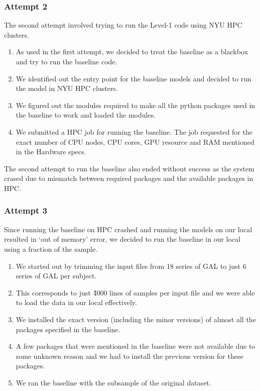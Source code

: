 \documentclass[final,leqno,onefignum,onetabnum]{siamltexmm}
\begin{document}
\subsubsection{Attempt 2}
The second attempt\cite{website:attempt_2} involved trying to run the Level-1 code using NYU HPC clusters.
\begin{enumerate}
  \item As used in the first attempt, we decided to treat the baseline as a blackbox and try to run the baseline code.
  \item We identified out the entry point for the baseline models and decided to run the model in NYU HPC clusters.
  \item We figured out the modules required to make all the python packages used in the baseline to work and loaded the modules.
  \item We submitted a HPC job for running the baseline.  The job requested for the exact number of CPU nodes, CPU cores, GPU resource and RAM mentioned in the Hardware specs. 
\end{enumerate}

The second attempt to run the baseline also ended without success as the system crased due to mismatch between required packages and the available packages in HPC\@.

\subsubsection{Attempt 3}
Since running the baseline on HPC crashed and running the models on our local resulted in `out of memory' error, we decided to run the baseline in our local using a fraction of the sample.

\begin{enumerate}
  \item We started out by trimming the input files from 18 series of GAL to just 6 series of GAL per subject.
  \item This corresponds to just \~4000 lines of samples per input file and we were able to load the data in our local effectively.
  \item We installed the exact version (including the minor versions) of almost all the packages specified in the baseline.
  \item A few packages that were mentioned in the baseline were not available due to some unknown reason and we had to install the previous version for these packages.
  \item We ran the baseline with the subsample of the original dataset.
\end{enumerate}
\end{document}
